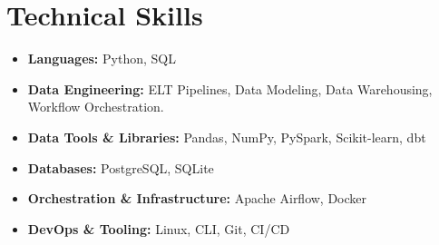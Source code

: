 
\section{Technical Skills}
\begin{itemize}[leftmargin=0in, label={}]
    \item \textbf{Languages:} Python, SQL
    \item \textbf{Data Engineering:} ELT Pipelines, Data Modeling, Data Warehousing, Workflow Orchestration.
    \item \textbf{Data Tools \& Libraries:} Pandas, NumPy, PySpark, Scikit-learn, dbt
    \item \textbf{Databases:} PostgreSQL, SQLite
    \item \textbf{Orchestration \& Infrastructure:} Apache Airflow, Docker
    \item \textbf{DevOps \& Tooling:} Linux, CLI, Git, CI/CD
\end{itemize}
